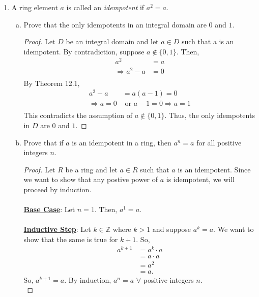 \documentclass[12pt, letterpaper]{article}
\begin{document}
\begin{enumerate}
    \item A ring element $a$ is called an \emph{idempotent} if $a^2 = a$. %
    \begin{enumerate}[(a)]
        \item Prove that the only idempotents in an integral domain are $0$ and $1$.

        \begin{proof}
            Let $D$ be an integral domain and let $a \in D$ such that a is an idempotent. By contradiction,
            suppose $a \notin \{0, 1\}$. Then,
            \begin{align*}
                a^{2} &= a \\ 
                \Rightarrow a^{2} - a &= 0 \\
                \end{align*}
            By Theorem 12.1, 
            \begin{align*}
                a^{2} - a &= a(a - 1)  = 0\\ 
                \Rightarrow a = 0 &\text{ or } a - 1 = 0 \Rightarrow a = 1\\ 
                \end{align*}
                This contradicts the assumption of $a \notin \{0, 1\}$. Thus, the only idempotents in $D$ are $0$ and $1$.
            \end{proof}

        \item Prove that if $a$ is an idempotent in a ring, then $a^n = a$ for all positive integers $n$.

        \begin{proof}
            Let $R$ be a ring and let $a \in R$ such that $a$ is an idempotent. Since we want to show that any postive power of $a$ is idempotent,
            we will proceed by induction. \\
            \\
            \underline{\textbf{Base Case}}: Let $n = 1$. Then, $a^{1} = a$. \\
            \\
            \underline{\textbf{Inductive Step}}: Let $k \in \mathbb{Z}$ where $k > 1$ and suppose $a^{k} = a$. We want to show that the same is true for 
            $k + 1$. So,
            \begin{align*}
                a^{k+1} &= a^{k} \cdot a \\
                &= a \cdot a \\
                &= a^{2} \\
                &= a.
                \end{align*}
                So, $a^{k+1} = a$. By induction, $a^n = a$ $\forall$ positive integers $n$.\\
        \end{proof}


\end{enumerate}
\end{enumerate}
\end{document}
